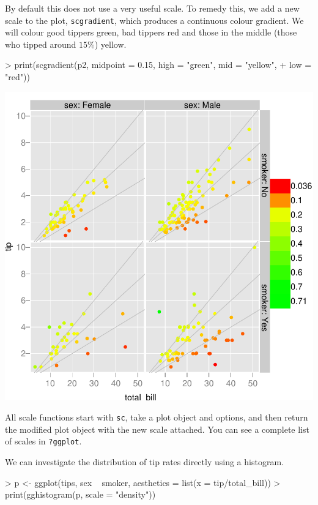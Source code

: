 \documentclass[]{article}
\begin{document}
By default this does not use a very useful scale.  To remedy this, we add a new scale to the plot, \texttt{scgradient}, which produces a continuous colour gradient.  We will colour good tippers green, bad tippers red and those in the middle (those who tipped around $15\%$) yellow.  

\begin{Schunk}
\begin{Sinput}
> print(scgradient(p2, midpoint = 0.15, high = "green", mid = "yellow", 
+     low = "red"))
\end{Sinput}
\end{Schunk}
\includegraphics{introduction-010}

All scale functions start with \texttt{sc}, take a plot object and options, and then return the modified plot object with the new scale attached.  You can see a complete list of scales in \texttt{?ggplot}.

We can investigate the distribution of tip rates directly using a histogram.

\begin{Schunk}
\begin{Sinput}
> p <- ggplot(tips, sex ~ smoker, aesthetics = list(x = tip/total_bill))
> print(gghistogram(p, scale = "density"))
\end{Sinput}
\end{Schunk}
\end{document}
